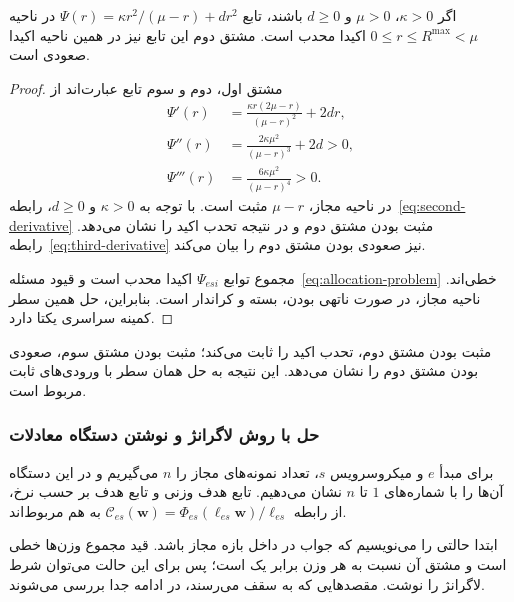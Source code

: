 \begin{proposition}
اگر $\kappa>0$، $\mu>0$ و $d\geq0$ باشند، تابع
$\Psi(r)=\kappa r^2/(\mu-r)+dr^2$
در ناحیه $0\leq r\leq R^{\mathrm{max}}<\mu$ اکیدا محدب است. مشتق دوم این تابع نیز در همین ناحیه اکیدا صعودی است.
\end{proposition}
\begin{proof}
مشتق اول، دوم و سوم تابع عبارت‌اند از
\begin{align}
  \Psi'(r)&=\frac{\kappa r(2\mu-r)}{(\mu-r)^2}+2dr,
    \label{eq:first-derivative}\\
  \Psi''(r)&=\frac{2\kappa\mu^2}{(\mu-r)^3}+2d>0,
    \label{eq:second-derivative}\\
  \Psi'''(r)&=\frac{6\kappa\mu^2}{(\mu-r)^4}>0.
    \label{eq:third-derivative}
\end{align}
در ناحیه مجاز، $\mu-r$ مثبت است. با توجه به $\kappa>0$ و $d\geq0$، رابطه~\eqref{eq:second-derivative} مثبت بودن مشتق دوم و در نتیجه تحدب اکید را نشان می‌دهد. رابطه~\eqref{eq:third-derivative} نیز صعودی بودن مشتق دوم را بیان می‌کند.

مجموع توابع $\Psi_{esi}$ اکیدا محدب است و قیود مسئله~\eqref{eq:allocation-problem} خطی‌اند. ناحیه مجاز، در صورت ناتهی بودن، بسته و کراندار است. بنابراین، حل همین سطر کمینه سراسری یکتا دارد.
\end{proof}

مثبت بودن مشتق دوم، تحدب اکید را ثابت می‌کند؛ مثبت بودن مشتق سوم، صعودی بودن مشتق دوم را نشان می‌دهد. این نتیجه به حل همان سطر با ورودی‌های ثابت مربوط است.

\subsubsection{حل با روش لاگرانژ و نوشتن دستگاه معادلات}
\label{sec:lagrange-system}

برای مبدأ $e$ و میکروسرویس $s$، تعداد نمونه‌های مجاز را $n$ می‌گیریم و در این دستگاه آن‌ها را با شماره‌های $1$ تا $n$ نشان می‌دهیم. تابع هدف وزنی و تابع هدف بر حسب نرخ، از رابطه $\mathcal C_{es}(\mathbf w)=\Phi_{es}(\ell_{es}\mathbf w)/\ell_{es}$ به هم مربوط‌اند.

ابتدا حالتی را می‌نویسیم که جواب در داخل بازه مجاز باشد. قید مجموع وزن‌ها خطی است و مشتق آن نسبت به هر وزن برابر یک است؛ پس برای این حالت می‌توان شرط لاگرانژ را نوشت. مقصدهایی که به سقف می‌رسند، در ادامه جدا بررسی می‌شوند.

